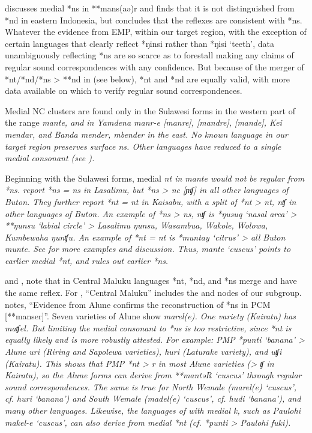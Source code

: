 \citet[242]{Blust1982} discusses medial *ns in **mans(aə)r
and finds that it is not distinguished from *nd in eastern Indonesia,
but concludes that the reflexes are consistent with *ns.
Whatever the evidence from EMP,
within our target region,
with the exception of certain  languages that
clearly reflect *ŋinsi rather than *ŋisi ‘teeth’,
data unambiguously reflecting *ns are so scarce as to forestall
making any claims of regular sound correspondences with any confidence.
But because of the merger of *nt/*nd/*ns > **nd in 
(see below), *nt and *nd are equally valid,
with more data available on which to verify regular sound correspondences.

Medial NC clusters are found only in the Sulawesi forms in the
western part of the range \it{mante},
and in Yamdena \it{manr-e} [manre],
[mandre], [mande], Kei \it{mendar}, and Banda \it{mender,
mbender} in the east.
No known language in our target region preserves surface \it{ns}.
Other languages have reduced to a single medial consonant (see ).

Beginning with the Sulawesi forms,
medial \it{nt} in \it{mante} would not be regular from *ns.
\citet[38--40]{MeadTruong2021} report *ns = \it{ns} in Lasalimu,
but *ns > \it{nc} [ɲʧ] in all other languages of Buton.
They further report *nt = \it{nt} in Kaisabu,
with a split of *nt > \it{nt,
nʧ} in other languages of Buton.
An example of *ns > \it{ns,
nʧ} is *ŋusuq ‘nasal area’ > **ŋunsu ‘labial circle’ > Lasalimu
\it{ŋunsu}, Wasambua, Wakole, Wolowa, Kumbewaha \it{ŋunʧu}.
An example of *nt = \it{nt} is *muntay ‘citrus’ > all Buton \it{munte}.
See \citet[38--40]{MeadTruong2021} for more examples and discussion.
Thus,  \it{mante} ‘cuscus’ points to earlier
medial *nt, and rules out earlier *ns.

\citet[41]{Stresemann1927} and \citet[36]{Collins1981}, \citeyear[55]{Collins1983} note
that in Central Maluku languages *nt,
*nd, and *ns merge
and have the same reflex.
For \citet{Collins1986}, “Central Maluku” includes the  and  nodes of our  subgroup.
\citet[43, endnote 29]{Collins1981} notes, “Evidence from Alune confirms
the reconstruction of *ns in PCM [**manser]”.
Seven varieties of Alune show \it{marel(e)}.
One variety (Kairatu) has \it{maʧel}.
But limiting the medial consonant to *ns is too restrictive,
since *nt is equally likely
and is more robustly attested.
For example: PMP *punti ‘banana’ > Alune \it{uri} (Riring
and Sapolewa varieties), \it{huri} (Laturake variety), and \it{uʧi} (Kairatu).
This shows that PMP *nt > \it{r} in most Alune varieties (> \it{ʧ}
in Kairatu), so the Alune forms can derive from **mantəR ‘cuscus’ through regular sound correspondences.
The same is true for North Wemale (\it{marel(e)} ‘cuscus’, cf.
\it{huri} ‘banana’) and South Wemale (\it{madel(e)} ‘cuscus’, cf.
\it{hudi} ‘banana’), and many other languages.
Likewise, the  languages of  with
medial \it{k}, such as Paulohi \it{makel-e} ‘cuscus’,
can also derive from medial *nt (cf.
*punti > Paulohi \it{fuki}).

